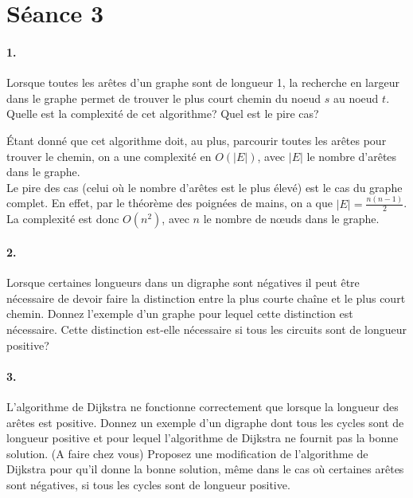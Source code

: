 %
%

\section{Séance 3}

\paragraph{1. } Lorsque toutes les arêtes d'un graphe sont de longueur 1, la recherche en largeur dans le graphe permet de trouver le plus court chemin du noeud $s$ au noeud $t$. Quelle est la complexité de cet algorithme? Quel est le pire cas?

\begin{solution}
	Étant donné que cet algorithme doit, au plus, parcourir toutes les arêtes pour trouver le chemin, on a une complexité en $O(\vert E \vert)$, avec $\vert E \vert$ le nombre d'arêtes dans le graphe.\\

	Le pire des cas (celui où le nombre d'arêtes est le plus élevé) est le cas du graphe complet. En effet, par le théorème des poignées de mains, on a que $\vert E \vert = \frac{n(n-1)}{2}$. La complexité est donc $O(n^2)$, avec $n$ le nombre de nœuds dans le graphe.
\end{solution}

\paragraph{2. } Lorsque certaines longueurs dans un digraphe sont négatives il peut être nécessaire de devoir faire la distinction entre la plus courte chaîne et le plus court chemin. Donnez l'exemple d'un graphe pour lequel cette distinction est nécessaire. Cette distinction est-elle nécessaire si tous les circuits sont de longueur positive?

\paragraph{3. } L'algorithme de Dijkstra ne fonctionne correctement que lorsque la longueur des arêtes est positive. Donnez un exemple d'un digraphe dont tous les cycles sont de longueur positive et pour lequel l'algorithme de Dijkstra ne fournit pas la bonne solution. (A faire chez vous) Proposez une modification de l'algorithme de Dijkstra pour qu'il donne la bonne solution, même dans le cas où certaines arêtes sont négatives, si tous les cycles sont de longueur positive.

